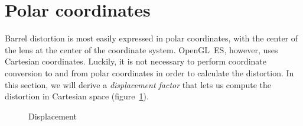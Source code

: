 \documentclass[english,12pt]{ifimaster}
\begin{document}
\section{Polar coordinates}

Barrel distortion is most easily expressed in polar coordinates, with
the center of the lens at the center of the coordinate system.
OpenGL~ES, however, uses Cartesian coordinates. Luckily, it is not
necessary to perform coordinate conversion to and from polar
coordinates in order to calculate the distortion. In this section, we
will derive a \emph{displacement factor} that lets us compute the
distortion in Cartesian space (figure~\ref{fig:displacement}).

\begin{figure}[b]
  \centering
  \quad{}

  \caption{Displacement}
  \label{fig:displacement}
\end{figure}
\end{document}
